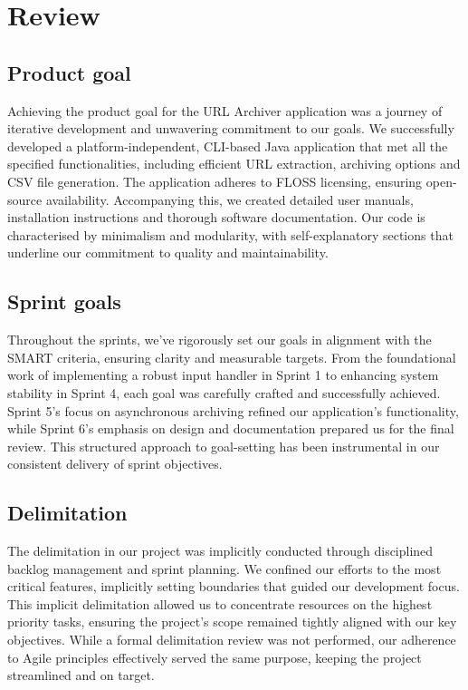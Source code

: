 \section{Review}

\subsection{Product goal}
Achieving the product goal for the URL Archiver application was a journey of iterative development and unwavering commitment to our goals.
We successfully developed a platform-independent, CLI-based Java application that met all the specified functionalities, including efficient URL extraction, archiving options and CSV file generation.
The application adheres to FLOSS licensing, ensuring open-source availability.
Accompanying this, we created detailed user manuals, installation instructions and thorough software documentation.
Our code is characterised by minimalism and modularity, with self-explanatory sections that underline our commitment to quality and maintainability.

\subsection{Sprint goals}
Throughout the sprints, we've rigorously set our goals in alignment with the SMART criteria, ensuring clarity and measurable targets.
From the foundational work of implementing a robust input handler in Sprint 1 to enhancing system stability in Sprint 4, each goal was carefully crafted and successfully achieved.
Sprint 5's focus on asynchronous archiving refined our application's functionality, while Sprint 6's emphasis on design and documentation prepared us for the final review.
This structured approach to goal-setting has been instrumental in our consistent delivery of sprint objectives.

\subsection{Delimitation}
The delimitation in our project was implicitly conducted through disciplined backlog management and sprint planning.
We confined our efforts to the most critical features, implicitly setting boundaries that guided our development focus.
This implicit delimitation allowed us to concentrate resources on the highest priority tasks, ensuring the project’s scope remained tightly aligned with our key objectives.
While a formal delimitation review was not performed, our adherence to Agile principles effectively served the same purpose, keeping the project streamlined and on target.

